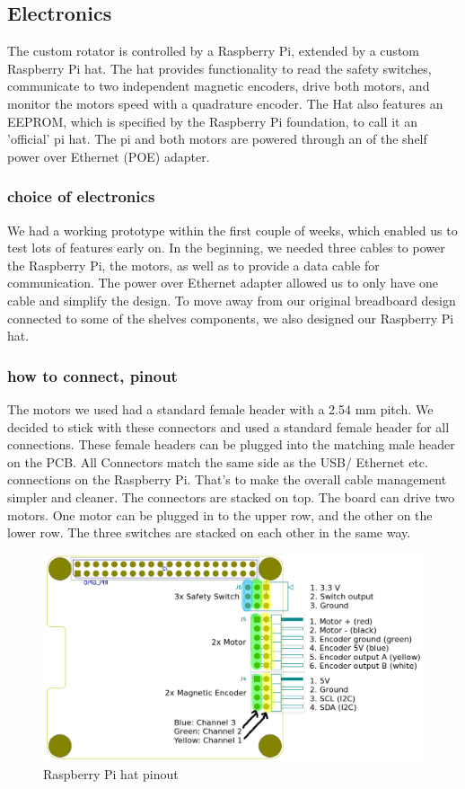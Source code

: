 \subsection{Electronics}
The custom rotator is controlled by a Raspberry Pi, extended by a custom Raspberry Pi hat. The hat provides functionality to read the safety switches, communicate to two independent magnetic encoders, drive both motors, and monitor the motors speed with a quadrature encoder. The Hat also features an EEPROM, which is specified by the Raspberry Pi foundation, to call it an 'official' pi hat. The pi and both motors are powered through an of the shelf power over Ethernet (POE) adapter.

\subsubsection{choice of electronics}
We had a working prototype within the first couple of weeks, which enabled us to test lots of features early on. In the beginning, we needed three cables to power the Raspberry Pi, the motors, as well as to provide a data cable for communication. The power over Ethernet adapter allowed us to only have one cable and simplify the design.
To move away from our original breadboard design connected to some of the shelves components, we also designed our Raspberry Pi hat.


\subsubsection{how to connect, pinout}

The motors we used had a standard female header with a 2.54 mm pitch. We decided to stick with these connectors and used a standard female header for all connections. These female headers can be plugged into the matching male header on the PCB. All Connectors match the same side as the USB/ Ethernet etc. connections on the Raspberry Pi. That's to make the overall cable management simpler and cleaner.
The connectors are stacked on top. The board can drive two motors. One motor can be plugged in to the upper row, and the other on the lower row. The three switches are stacked on each other in the same way.

\begin{figure}[H]
	\centering
	\includegraphics[scale=0.2]{../art/PCB Pinout.png}
	\caption{Raspberry Pi hat pinout}
\end{figure}

